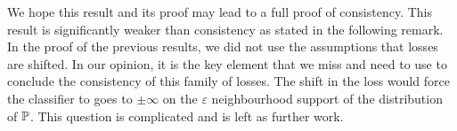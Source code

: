 We hope this result and its proof may lead to a full proof of consistency. This result is significantly weaker than consistency as stated in the following remark. In the proof of the previous results, we did not use the assumptions that losses are shifted. In our opinion, it is the key element that we miss and need to use to conclude the consistency of this family of losses. The shift in the loss would force the classifier to goes to $\pm \infty$ on the $\varepsilon$ neighbourhood support of the distribution of $\mathbb{P}$. This question is complicated and is left as further work.  
